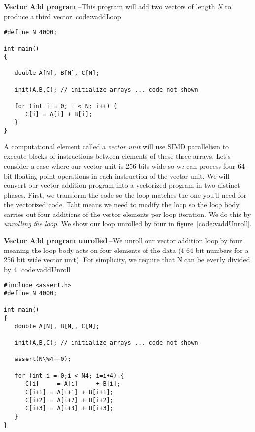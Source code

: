 \begin{CodeExample}%
{\textbf{Vector Add program} --\small This program will add two vectors of length $N$
to produce a third vector.
}%
{code:vaddLoop}
\begin{lstlisting}
#define N 4000;

int main()
{

   double A[N], B[N], C[N];
     
   init(A,B,C); // initialize arrays ... code not shown
   
   for (int i = 0; i < N; i++) {
      C[i] = A[i] + B[i];
   }
}	  
\end{lstlisting}
\end{CodeExample}


A computational element called a \emph{vector unit}
will use SIMD parallelism to execute blocks of instructions between elements of these three arrays.  
Let's consider a case where our vector unit is 256 bits
wide so we can process four 64-bit floating point operations in each instruction of the vector unit.  
We will convert our vector addition program into a vectorized program in two distinct phases. First, 
we transform the code so the loop matches the one you'll
need for the vectorized code.   Taht means we need to 
modify the loop so the loop body carries out four additions of the vector elements per loop iteration.
We do this by \emph{unrolling the loop}.  We show our loop unrolled by four in figure~\ref{code:vaddUnroll}.  

\begin{CodeExample}%
{\textbf{Vector Add program unrolled} --\small We unroll our vector addition loop by four meaning
the loop body acts on four elements of the data (4 64 bit numbers for a 256 bit wide vector unit).   For 
simplicity, we require that N can be evenly divided by 4.
}%
{code:vaddUnroll}
\begin{lstlisting}
#include <assert.h>
#define N 4000;

int main()
{
   double A[N], B[N], C[N];
   
   init(A,B,C); // initialize arrays ... code not shown
   
   assert(N\%4==0);

   for (int i = 0;i < N4; i=i+4) {
      C[i]     = A[i]     + B[i];
      C[i+1] = A[i+1] + B[i+1];
      C[i+2] = A[i+2] + B[i+2];
      C[i+3] = A[i+3] + B[i+3];   
   }
}	  
\end{lstlisting}
\end{CodeExample}

